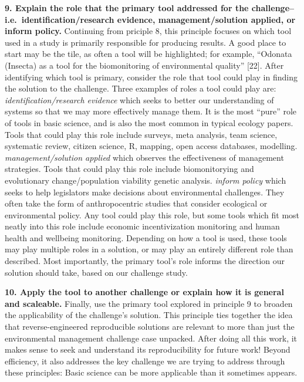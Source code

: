 \documentclass[10pt,letterpaper]{article}
\begin{document}
\textbf{9. Explain the role that the primary tool addressed for the
challenge--i.e.~identification/research evidence, management/solution
applied, or inform policy.} Continuing from priciple 8, this principle
focuses on which tool used in a study is primarily responsible for
producing results. A good place to start may be the tile, as often a
tool will be highlighted; for example, ``Odonata (Insecta) as a tool for
the biomonitoring of environmental quality'' {[}22{]}. After identifying
which tool is primary, consider the role that tool could play in finding
the solution to the challenge. Three examples of roles a tool could play
are: \emph{identification/research evidence} which seeks to better our
understanding of systems so that we may more effectively manage them. It
is the most ``pure'' role of tools in basic science, and is also the
most common in typical ecology papers. Tools that could play this role
include surveys, meta analysis, team science, systematic review, citizen
science, R, mapping, open access databases, modelling.
\emph{management/solution applied} which observes the effectiveness of
management strategies. Tools that could play this role include
biomonitorying and evolutionary change/population viability genetic
analysis. \emph{inform policy} which seeks to help legislators make
decisions about environmental challenges. They often take the form of
anthropocentric studies that consider ecological or environmental
policy. Any tool could play this role, but some tools which fit most
neatly into this role include economic incentivization monitoring and
human health and wellbeing monitoring. Depending on how a tool is used,
these tools may play multiple roles in a solution, or may play an
entirely different role than described. Most importantly, the primary
tool's role informs the direction our solution should take, based on our
challenge study.

\textbf{10. Apply the tool to another challenge or explain how it is
general and scaleable.} Finally, use the primary tool explored in
principle 9 to broaden the applicability of the challenge's solution.
This principle ties together the idea that reverse-engineered
reproducible solutions are relevant to more than just the environmental
management challenge case unpacked. After doing all this work, it makes
sense to seek and understand its reproducibility for future work! Beyond
efficiency, it also addresses the key challenge we are trying to address
through these principles: Basic science can be more applicable than it
sometimes appears.
\end{document}
